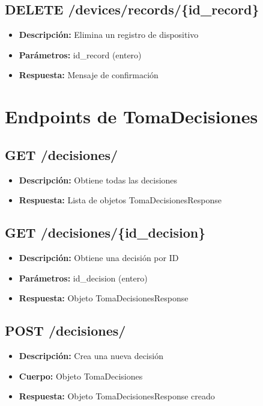 \documentclass[12pt,letterpaper]{report}
\begin{document}
\subsection{DELETE /devices/records/\{id\_record\}}
\begin{itemize}
    \item \textbf{Descripción:} Elimina un registro de dispositivo
    \item \textbf{Parámetros:} id\_record (entero)
    \item \textbf{Respuesta:} Mensaje de confirmación
\end{itemize}

\section{Endpoints de TomaDecisiones}
\subsection{GET /decisiones/}
\begin{itemize}
    \item \textbf{Descripción:} Obtiene todas las decisiones
    \item \textbf{Respuesta:} Lista de objetos TomaDecisionesResponse
\end{itemize}

\subsection{GET /decisiones/\{id\_decision\}}
\begin{itemize}
    \item \textbf{Descripción:} Obtiene una decisión por ID
    \item \textbf{Parámetros:} id\_decision (entero)
    \item \textbf{Respuesta:} Objeto TomaDecisionesResponse
\end{itemize}

\subsection{POST /decisiones/}
\begin{itemize}
    \item \textbf{Descripción:} Crea una nueva decisión
    \item \textbf{Cuerpo:} Objeto TomaDecisiones
    \item \textbf{Respuesta:} Objeto TomaDecisionesResponse creado
\end{itemize}
\end{document}
